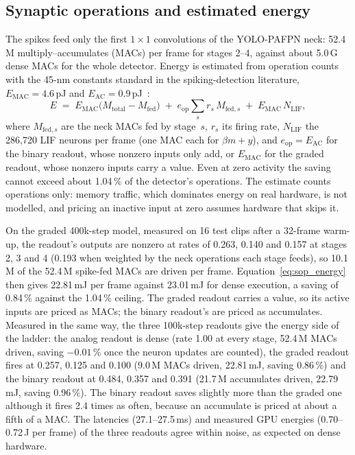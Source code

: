 \documentclass[11pt, a4paper]{report}
\begin{document}
\subsection{Synaptic operations and estimated energy}
\label{subsec:spk_energy}
The spikes feed only the first $1\times1$ convolutions of the YOLO-PAFPN neck: 52.4\,M multiply--accumulates
(MACs) per frame for stages 2--4, against about 5.0\,G dense MACs for the whole detector. Energy is estimated
from operation counts with the 45-nm constants standard in the spiking-detection literature,
$E_{\mathrm{MAC}} = 4.6$\,pJ and $E_{\mathrm{AC}} = 0.9$\,pJ~\cite{horowitz2014computing}:
\begin{equation}
  E \;=\; E_{\mathrm{MAC}}\big(M_{\mathrm{total}} - M_{\mathrm{fed}}\big)
     \;+\; e_{\mathrm{op}} \sum_{s} r_s\, M_{\mathrm{fed},s}
     \;+\; E_{\mathrm{MAC}}\, N_{\mathrm{LIF}},
  \label{eq:sop_energy}
\end{equation}
where $M_{\mathrm{fed},s}$ are the neck MACs fed by stage~$s$, $r_s$ its firing rate, $N_{\mathrm{LIF}}$ the
286{,}720 LIF neurons per frame (one MAC each for $\beta m + y$), and $e_{\mathrm{op}} = E_{\mathrm{AC}}$ for
the binary readout, whose nonzero inputs only add, or $E_{\mathrm{MAC}}$ for the graded readout, whose nonzero
inputs carry a value. Even at zero activity the saving cannot exceed about 1.04\,\% of the detector's
operations. The estimate counts operations only: memory traffic, which dominates energy on real hardware, is
not modelled, and pricing an inactive input at zero assumes hardware that skips it.

On the graded 400k-step model, measured on 16 test clips after a 32-frame warm-up, the readout's outputs are
nonzero at rates of 0.263, 0.140 and 0.157 at stages 2, 3 and 4 (0.193 when weighted by the neck operations
each stage feeds), so 10.1\,M of the 52.4\,M spike-fed MACs are driven per frame. Equation~\eqref{eq:sop_energy}
then gives 22.81\,mJ per frame against 23.01\,mJ for dense execution, a saving of 0.84\,\% against the
1.04\,\% ceiling. The graded readout carries a value, so its active inputs are priced as MACs; the binary
readout's are priced as accumulates. Measured in the same way, the three 100k-step readouts give the energy
side of the ladder: the analog readout is dense (rate 1.00 at every stage, 52.4\,M MACs driven, saving
$-0.01$\,\% once the neuron updates are counted), the graded readout fires at 0.257, 0.125 and 0.100 (9.0\,M
MACs driven, 22.81\,mJ, saving 0.86\,\%) and the binary readout at 0.484, 0.357 and 0.391 (21.7\,M
accumulates driven, 22.79\,mJ, saving 0.96\,\%). The binary readout saves slightly more than the graded one
although it fires 2.4 times as often, because an accumulate is priced at about a fifth of a MAC. The
latencies (27.1--27.5\,ms) and measured GPU energies (0.70--0.72\,J per frame) of the three readouts agree
within noise, as expected on dense hardware.
\end{document}
